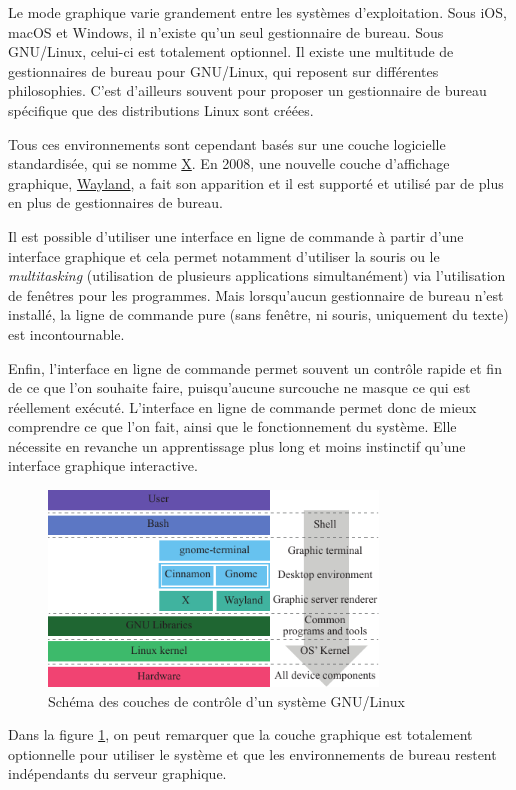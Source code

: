 Le mode graphique varie grandement entre les systèmes d'exploitation. Sous iOS, macOS et Windows, il n'existe qu'un seul gestionnaire de bureau. Sous GNU/Linux, celui-ci est totalement optionnel. Il existe une multitude de gestionnaires de bureau pour GNU/Linux, qui reposent sur différentes philosophies. C'est d'ailleurs souvent pour proposer un gestionnaire de bureau spécifique que des distributions Linux sont créées.

Tous ces environnements sont cependant basés sur une couche logicielle standardisée, qui se nomme \href{https://www.x.org}{X}. En 2008, une nouvelle couche d'affichage graphique, \href{https://wayland.freedesktop.org}{Wayland}, a fait son apparition et il est supporté et utilisé par de plus en plus de gestionnaires de bureau.

Il est possible d'utiliser une interface en ligne de commande à partir d'une interface graphique et cela permet notamment d'utiliser la souris ou le \textit{multitasking} (utilisation de plusieurs applications simultanément) via l'utilisation de fenêtres pour les programmes. Mais lorsqu'aucun gestionnaire de bureau n'est installé, la ligne de commande pure (sans fenêtre, ni souris, uniquement du texte) est incontournable.

Enfin, l'interface en ligne de commande permet souvent un contrôle rapide et fin de ce que l'on souhaite faire, puisqu'aucune surcouche ne masque ce qui est réellement exécuté. L'interface en ligne de commande permet donc de mieux comprendre ce que l'on fait, ainsi que le fonctionnement du système. Elle nécessite en revanche un apprentissage plus long et moins instinctif qu'une interface graphique interactive.

\begin{figure}[hb!]
\includegraphics[width=0.78\textwidth]{res/linux_control_interface.pdf}
\centering
\caption{Schéma des couches de contrôle d'un système GNU/Linux}
\label{fig:interface}
\end{figure} \vspace{-2mm}

 Dans la figure \ref{fig:interface}, on peut remarquer que la couche graphique est totalement optionnelle pour utiliser le système et que les environnements de bureau restent indépendants du serveur graphique.